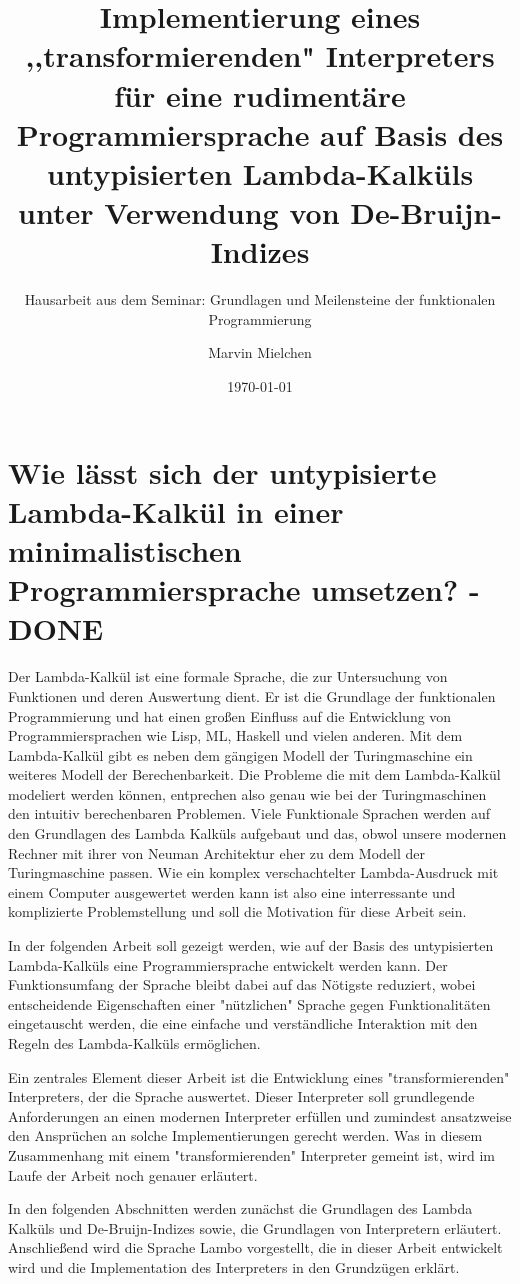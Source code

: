 \documentclass[ngerman]{article}
\title{Implementierung eines ,,transformierenden" Interpreters für eine rudimentäre Programmiersprache auf Basis des untypisierten Lambda-Kalküls unter Verwendung von De-Bruijn-Indizes}
\author{Marvin Mielchen}
\subtitle{Hausarbeit aus dem Seminar: Grundlagen und Meilensteine der funktionalen Programmierung}
\date{\today}
\begin{document}
\maketitle


\section{Wie lässt sich der untypisierte Lambda-Kalkül in einer minimalistischen Programmiersprache umsetzen? - DONE}

Der Lambda-Kalkül ist eine formale Sprache, die zur Untersuchung von Funktionen und deren Auswertung dient. Er ist die Grundlage der funktionalen Programmierung und hat einen großen Einfluss auf die Entwicklung von Programmiersprachen wie Lisp, ML, Haskell und vielen anderen.
Mit dem Lambda-Kalkül gibt es neben dem gängigen Modell der Turingmaschine ein weiteres Modell der Berechenbarkeit. 
Die Probleme die mit dem Lambda-Kalkül modeliert werden können, entprechen also genau wie bei der Turingmaschinen den intuitiv berechenbaren Problemen.
Viele Funktionale Sprachen werden auf den Grundlagen des Lambda Kalküls aufgebaut und das, obwol unsere modernen Rechner mit ihrer von Neuman Architektur eher zu dem Modell der Turingmaschine passen.
Wie ein komplex verschachtelter Lambda-Ausdruck mit einem Computer ausgewertet werden kann ist also eine interressante und komplizierte Problemstellung und soll die Motivation für diese Arbeit sein.

In der folgenden Arbeit soll gezeigt werden, wie auf der Basis des untypisierten Lambda-Kalküls eine Programmiersprache entwickelt werden kann. Der Funktionsumfang der Sprache bleibt dabei auf das Nötigste reduziert, wobei entscheidende Eigenschaften einer "nützlichen" Sprache gegen Funktionalitäten eingetauscht werden, die eine einfache und verständliche Interaktion mit den Regeln des Lambda-Kalküls ermöglichen.

Ein zentrales Element dieser Arbeit ist die Entwicklung eines "transformierenden" Interpreters, der die Sprache auswertet. Dieser Interpreter soll grundlegende Anforderungen an einen modernen Interpreter erfüllen und zumindest ansatzweise den Ansprüchen an solche Implementierungen gerecht werden.
Was in diesem Zusammenhang mit einem "transformierenden" Interpreter gemeint ist, wird im Laufe der Arbeit noch genauer erläutert.

In den folgenden Abschnitten werden zunächst die Grundlagen des Lambda Kalküls und De-Bruijn-Indizes sowie, die Grundlagen von Interpretern erläutert. Anschließend wird die Sprache Lambo vorgestellt, die in dieser Arbeit entwickelt wird und die Implementation des Interpreters in den Grundzügen erklärt.
\end{document}

